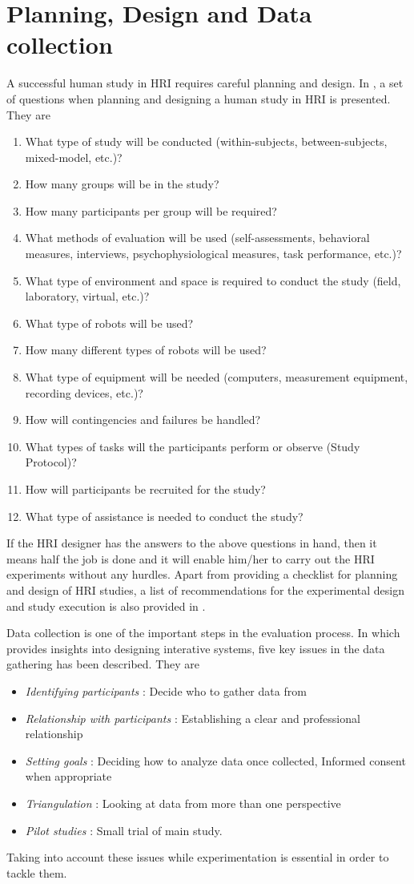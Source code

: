 \section{Planning, Design and Data collection}
A successful human study in HRI requires careful planning and design. In \cite{Bethel2010}, a set of questions  when planning and designing a human study in HRI is presented. They are
\begin{enumerate}
\item What type of study will be conducted (within-subjects, between-subjects, mixed-model, etc.)?
\item How many groups will be in the study?
\item How many participants per group will be required?
\item What methods of evaluation will be used (self-assessments, behavioral measures, interviews, psychophysiological measures, task performance, etc.)?
\item What type of environment and space is required to conduct the study (field, laboratory, virtual, etc.)?
\item What type of robots will be used?
\item How many different types of robots will be used?
\item What type of equipment will be needed (computers, measurement equipment, recording devices, etc.)?
\item How will contingencies and failures be handled?
\item What types of tasks will the participants perform or observe (Study Protocol)?
\item How will participants be recruited for the study?
\item What type of assistance is needed to conduct the study?
\end{enumerate}
	If the HRI designer has the answers to the above questions in hand, then it means half the job is done and it will enable him/her to carry out the HRI experiments without any hurdles. Apart from providing a checklist for planning and design of HRI studies, a list of recommendations for the experimental design and study execution is also provided in \cite{Bethel2010}.
	
	Data collection is one of the important steps in the evaluation process. In \cite{Rogers2011} which provides insights into designing interative systems, five key issues in the data gathering has been described. They are 
\begin{itemize}
\item \emph{Identifying participants} : Decide who to gather data from
\item \emph{Relationship with participants} : Establishing a clear and professional relationship
\item \emph{Setting goals} : Deciding how to analyze data once collected, Informed consent when appropriate
\item \emph{Triangulation} : Looking at data from more than one perspective
\item \emph{Pilot studies} : Small trial of main study. 
\end{itemize}
Taking into account these issues while experimentation is essential in order to tackle them. 

